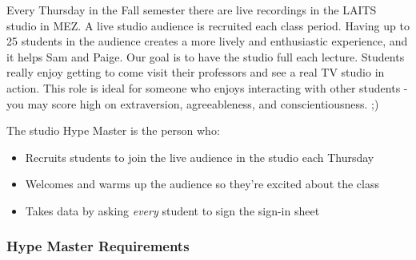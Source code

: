 \documentclass[
]{article}
\providecommand{\tightlist}{%
  \setlength{\itemsep}{0pt}\setlength{\parskip}{0pt}}
\begin{document}
Every Thursday in the Fall semester there are live recordings in the LAITS studio in MEZ. A live studio audience is recruited each class period. Having up to 25 students in the audience creates a more lively and enthusiastic experience, and it helps Sam and Paige. Our goal is to have the studio full each lecture. Students really enjoy getting to come visit their professors and see a real TV studio in action. This role is ideal for someone who enjoys interacting with other students - you may score high on extraversion, agreeableness, and conscientiousness. ;)

The studio Hype Master is the person who:

\begin{itemize}
\tightlist
\item
  Recruits students to join the live audience in the studio each Thursday
\item
  Welcomes and warms up the audience so they're excited about the class
\item
  Takes data by asking \emph{every} student to sign the sign-in sheet
\end{itemize}

\hypertarget{hype-master-requirements}{%
\subsubsection{Hype Master Requirements}\label{hype-master-requirements}}
\end{document}
